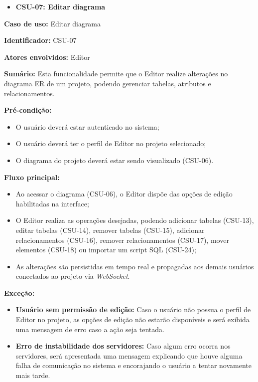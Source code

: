 \begin{itemize}
    \item \textbf{CSU-07: Editar diagrama}
\end{itemize}

\textbf{Caso de uso:} Editar diagrama

\textbf{Identificador:} CSU-07

\textbf{Atores envolvidos:} Editor

\textbf{Sumário:} Esta funcionalidade permite que o Editor realize alterações no diagrama ER de um projeto, podendo gerenciar tabelas, atributos e relacionamentos.

\textbf{Pré-condição:}
\begin{itemize}
    \item O usuário deverá estar autenticado no sistema;
    \item O usuário deverá ter o perfil de Editor no projeto selecionado;
    \item O diagrama do projeto deverá estar sendo visualizado (CSU-06).
\end{itemize}

\textbf{Fluxo principal:}
\begin{itemize}
    \item Ao acessar o diagrama (CSU-06), o Editor dispõe das opções de edição habilitadas na interface;
    \item O Editor realiza as operações desejadas, podendo adicionar tabelas (CSU-13), editar tabelas (CSU-14), remover tabelas (CSU-15), adicionar relacionamentos (CSU-16), remover relacionamentos (CSU-17), mover elementos (CSU-18) ou importar um script SQL (CSU-24);
    \item As alterações são persistidas em tempo real e propagadas aos demais usuários conectados ao projeto via \textit{WebSocket}.
\end{itemize}

\textbf{Exceção:}
\begin{itemize}
    \item \textbf{Usuário sem permissão de edição:} Caso o usuário não possua o perfil de Editor no projeto, as opções de edição não estarão disponíveis e será exibida uma mensagem de erro caso a ação seja tentada.
    \item \textbf{Erro de instabilidade dos servidores:} Caso algum erro ocorra nos servidores, será apresentada uma mensagem explicando que houve alguma falha de comunicação no sistema e encorajando o usuário a tentar novamente mais tarde.
\end{itemize}

